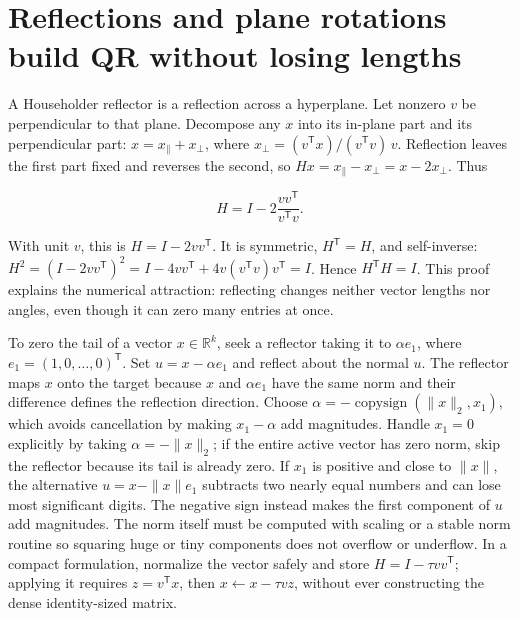 \section{Reflections and plane rotations build QR without losing lengths}\label{01-foundations-i-ch020-reflections-and-plane-rotations-build-qr-without-losing-lengths}

\hypertarget{01-foundations-i-ch020-reflections-and-plane-rotations-build-qr-without-losing-lengths}{}

A Householder reflector is a reflection across a hyperplane. Let nonzero \(v\) be perpendicular to that plane. Decompose any \(x\) into its in-plane part and its perpendicular part: \(x=x_\parallel+x_\perp\), where \(x_\perp=(v^\mathsf Tx)/(v^\mathsf Tv)\,v\). Reflection leaves the first part fixed and reverses the second, so \(Hx=x_\parallel-x_\perp=x-2x_\perp\). Thus

\[
H=I-2\frac{vv^\mathsf T}{v^\mathsf Tv}.
\]

With unit \(v\), this is \(H=I-2vv^\mathsf T\). It is symmetric, \(H^\mathsf T=H\), and self-inverse: \(H^2=(I-2vv^\mathsf T)^2=I-4vv^\mathsf T+4v(v^\mathsf Tv)v^\mathsf T=I\). Hence \(H^\mathsf TH=I\). This proof explains the numerical attraction: reflecting changes neither vector lengths nor angles, even though it can zero many entries at once.

To zero the tail of a vector \(x\in\mathbb R^k\), seek a reflector taking it to \(\alpha e_1\), where \(e_1=(1,0,\ldots,0)^\mathsf T\). Set \(u=x-\alpha e_1\) and reflect about the normal \(u\). The reflector maps \(x\) onto the target because \(x\) and \(\alpha e_1\) have the same norm and their difference defines the reflection direction. Choose \(\alpha=-\operatorname{copysign}(\|x\|_2,x_1)\), which avoids cancellation by making \(x_1-\alpha\) add magnitudes. Handle \(x_1=0\) explicitly by taking \(\alpha=-\|x\|_2\); if the entire active vector has zero norm, skip the reflector because its tail is already zero. If \(x_1\) is positive and close to \(\|x\|\), the alternative \(u=x-\|x\|e_1\) subtracts two nearly equal numbers and can lose most significant digits. The negative sign instead makes the first component of \(u\) add magnitudes. The norm itself must be computed with scaling or a stable norm routine so squaring huge or tiny components does not overflow or underflow. In a compact formulation, normalize the vector safely and store \(H=I-\tau v v^\mathsf T\); applying it requires \(z=v^\mathsf Tx\), then \(x\leftarrow x-\tau vz\), without ever constructing the dense identity-sized matrix.

